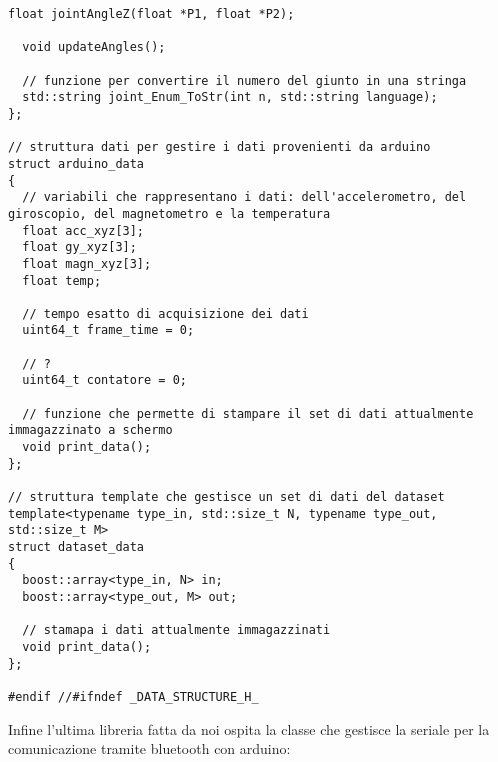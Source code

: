 \documentclass[10pt,a4paper]{article}
\begin{document}
\begin{lstlisting}[style=mycpp, caption=librerie usate, captionpos=b]
  float jointAngleZ(float *P1, float *P2);

  void updateAngles();

  // funzione per convertire il numero del giunto in una stringa
  std::string joint_Enum_ToStr(int n, std::string language);
};

// struttura dati per gestire i dati provenienti da arduino
struct arduino_data
{
  // variabili che rappresentano i dati: dell'accelerometro, del giroscopio, del magnetometro e la temperatura
  float acc_xyz[3];
  float gy_xyz[3];
  float magn_xyz[3];
  float temp;

  // tempo esatto di acquisizione dei dati
  uint64_t frame_time = 0;

  // ?
  uint64_t contatore = 0;

  // funzione che permette di stampare il set di dati attualmente immagazzinato a schermo 
  void print_data();
};

// struttura template che gestisce un set di dati del dataset
template<typename type_in, std::size_t N, typename type_out, std::size_t M>
struct dataset_data
{
  boost::array<type_in, N> in;
  boost::array<type_out, M> out;

  // stamapa i dati attualmente immagazzinati
  void print_data();
};

#endif //#ifndef _DATA_STRUCTURE_H_
\end{lstlisting}
%
%
Infine l'ultima libreria fatta da noi ospita la classe che gestisce la seriale per la comunicazione tramite bluetooth con arduino:
\end{document}
